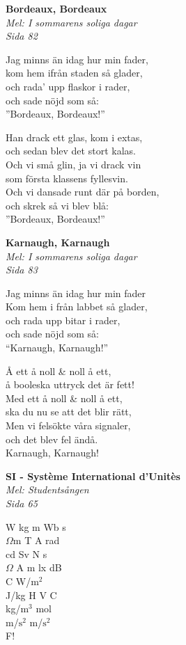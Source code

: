 \documentclass[10pt]{article}
\newenvironment{song}[2]{
	\textbf{#1}\\
	\emph{#2}\par
	\vspace{-1mm}
}{
	\vspace{2mm}
}
\begin{document}
\begin{multicols*}{2}
\vfill
\columnbreak

\begin{song}{Bordeaux, Bordeaux}{Mel: I sommarens soliga dagar\\Sida 82}
	Jag minns än idag hur min fader,\\
	kom hem ifrån staden så glader,\\
	och rada’ upp flaskor i rader,\\
	och sade nöjd som så:\\
	”Bordeaux, Bordeaux!”

	Han drack ett glas, kom i extas,\\
	och sedan blev det stort kalas.\\
	Och vi små glin, ja vi drack vin\\
	som första klassens fyllesvin.\\
	Och vi dansade runt där på borden,\\
	och skrek så vi blev blå:\\
	”Bordeaux, Bordeaux!”
\end{song}

\begin{song}{Karnaugh, Karnaugh}{Mel: I sommarens soliga dagar\\Sida 83}
	Jag minns än idag hur min fader\\
	Kom hem i från labbet så glader,\\
	och rada upp bitar i rader,\\
	och sade nöjd som så:\\
	``Karnaugh, Karnaugh!''

	Å ett å noll \& noll å ett,\\
	å booleska uttryck det är fett!\\
	Med ett å noll \& noll å ett,\\
	ska du nu se att det blir rätt,\\
	Men vi felsökte våra signaler,\\
	och det blev fel ändå.\\
	Karnaugh, Karnaugh!
\end{song}

\begin{song}{SI - Système International d'Unitès}{Mel: Studentsången\\Sida 65}
	W kg m Wb s\\
	$\Omega$m T A rad\\
	cd Sv N s\\
	$\Omega$ A m lx dB\\
	\degree C W/$\text{m}^2$\\
	J/kg H V C\\
	kg/$\text{m}^3$ mol\\
	m/$\text{s}^2$ m/$\text{s}^2$\\
	F!
\end{song}


\end{multicols*}
\end{document}
